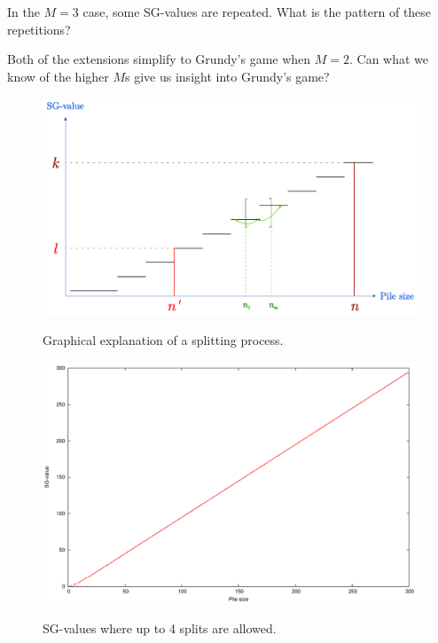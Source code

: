 \documentclass[english,a4paper,twoside]{amsart}
\theoremstyle{lemma}
\begin{document}
In the $M=3$ case, some SG-values are repeated. What is the pattern of these repetitions?

Both of the extensions simplify to Grundy's game when $M=2$. Can what we know of the higher
$M$s give us insight into Grundy's game?



\newpage

\begin{figure}
    \caption{Graphical explanation of a splitting process.}
    \includegraphics[width=\linewidth]{explanation.pdf}
    \label{fig:explanation}
\end{figure}

\begin{figure}
    \caption{SG-values where up to 4 splits are allowed.}
    \includegraphics[width=\linewidth]{../plots/any4.pdf}
    \label{fig:any4}
\end{figure}
\end{document}
